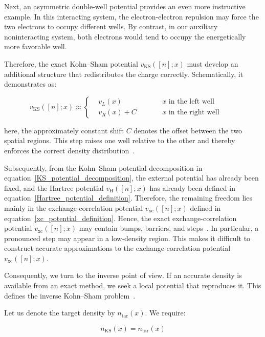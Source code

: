 Next, an asymmetric double-well potential provides an even more instructive example.
In this interacting system,
the electron-electron repulsion may force the two electrons to occupy different wells.
By contrast, in our auxiliary noninteracting system,
both electrons would tend to occupy the energetically more favorable well.

Therefore, the exact Kohn--Sham potential $v_\mathrm{KS}([n];x)$ must develop an additional structure that redistributes the charge correctly.
Schematically, it demonstrates as:

\begin{equation}
v_\mathrm{KS}([n];x)\approx\left\{
\begin{aligned}
    &v_L(x)      &&\qquad \text{$x$ in the left well} \\
    &v_R(x)+C    &&\qquad \text{$x$ in the right well}
\end{aligned}\right.
\qquad
\label{KS_step_structure_schematic}
\end{equation}

here, the approximately constant shift $C$ denotes the offset between the two spatial regions.
This step raises one well relative to the other and thereby enforces the correct density distribution~\cite{makmal2011dissociation}.

Subsequently, from the Kohn--Sham potential decomposition in equation~\eqref{KS_potential_decomposition},
the external potential has already been fixed, and the Hartree potential $v_\mathrm{H}([n];x)$ has already been defined in equation~\eqref{Hartree_potential_definition}.
Therefore, the remaining freedom lies mainly in the exchange-correlation potential $v_\mathrm{xc}([n];x)$ defined in equation~\eqref{xc_potential_definition}.
Hence, the exact exchange-correlation potential $v_\mathrm{xc}([n];x)$ may contain bumps, barriers, and steps~\cite{hodgson2016origin}.
In particular, a pronounced step may appear in a low-density region.
This makes it difficult to construct accurate approximations to the exchange-correlation potential $v_\mathrm{xc}([n];x)$.

Consequently, we turn to the inverse point of view.
If an accurate density is available from an exact method, we seek a local potential that reproduces it.
This defines the inverse Kohn--Sham problem~\cite{wang1993construction, astala2006kohn}.

Let us denote the target density by $n_\mathrm{tar}(x)$.
We require:

\begin{equation}
    n_\mathrm{KS}(x)=n_\mathrm{tar}(x)
\label{inverse_KS_target_density_condition}
\end{equation}

